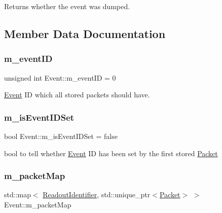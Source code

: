 Returns whether the event was dumped. 



\subsection{Member Data Documentation}
\mbox{\label{class_event_af0c352ab6a128f9df56b231d941aff25}} 
\subsubsection{\texorpdfstring{m\+\_\+event\+ID}{m\_eventID}}
{\footnotesize\ttfamily unsigned int Event\+::m\+\_\+event\+ID = 0\hspace{0.3cm}{\ttfamily [private]}}



\hyperlink{class_event}{Event} ID which all stored packets should have. 

\mbox{\label{class_event_a3b435b2fe840647c01ae0ee838b66a54}} 
\subsubsection{\texorpdfstring{m\+\_\+is\+Event\+I\+D\+Set}{m\_isEventIDSet}}
{\footnotesize\ttfamily bool Event\+::m\+\_\+is\+Event\+I\+D\+Set = false\hspace{0.3cm}{\ttfamily [private]}}



bool to tell whether \hyperlink{class_event}{Event} ID has been set by the first stored \hyperlink{class_packet}{Packet} 

\mbox{\label{class_event_a0ae595a22c44ddc6003ac31ee17f6f86}} 
\subsubsection{\texorpdfstring{m\+\_\+packet\+Map}{m\_packetMap}}
{\footnotesize\ttfamily std\+::map$<$ \hyperlink{class_readout_identifier}{Readout\+Identifier}, std\+::unique\+\_\+ptr$<$\hyperlink{class_packet}{Packet}$>$ $>$ Event\+::m\+\_\+packet\+Map\hspace{0.3cm}{\ttfamily [private]}}



